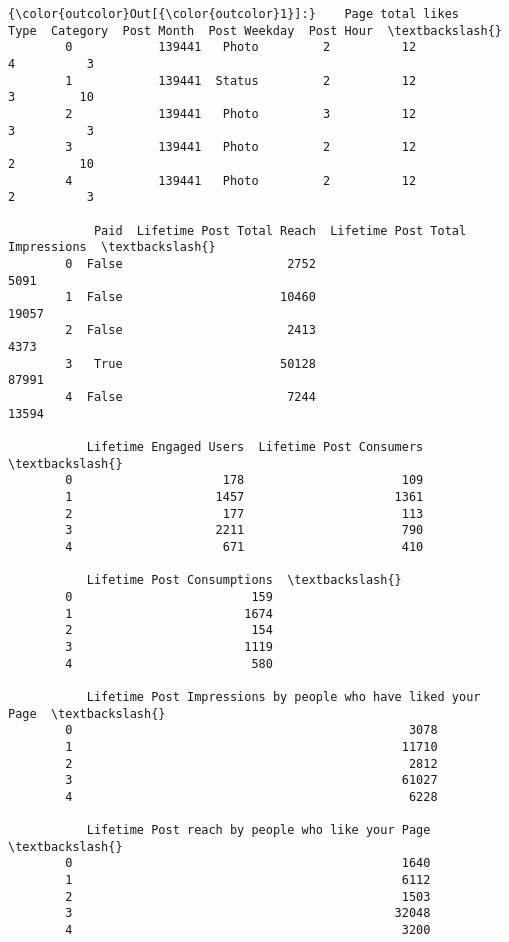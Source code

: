 \documentclass[11pt]{article}
\begin{document}
\begin{Verbatim}[commandchars=\\\{\}]
{\color{outcolor}Out[{\color{outcolor}1}]:}    Page total likes    Type  Category  Post Month  Post Weekday  Post Hour  \textbackslash{}
        0            139441   Photo         2          12             4          3   
        1            139441  Status         2          12             3         10   
        2            139441   Photo         3          12             3          3   
        3            139441   Photo         2          12             2         10   
        4            139441   Photo         2          12             2          3   
        
            Paid  Lifetime Post Total Reach  Lifetime Post Total Impressions  \textbackslash{}
        0  False                       2752                             5091   
        1  False                      10460                            19057   
        2  False                       2413                             4373   
        3   True                      50128                            87991   
        4  False                       7244                            13594   
        
           Lifetime Engaged Users  Lifetime Post Consumers  \textbackslash{}
        0                     178                      109   
        1                    1457                     1361   
        2                     177                      113   
        3                    2211                      790   
        4                     671                      410   
        
           Lifetime Post Consumptions  \textbackslash{}
        0                         159   
        1                        1674   
        2                         154   
        3                        1119   
        4                         580   
        
           Lifetime Post Impressions by people who have liked your Page  \textbackslash{}
        0                                               3078              
        1                                              11710              
        2                                               2812              
        3                                              61027              
        4                                               6228              
        
           Lifetime Post reach by people who like your Page  \textbackslash{}
        0                                              1640   
        1                                              6112   
        2                                              1503   
        3                                             32048   
        4                                              3200   
        

\end{Verbatim}
\end{document}

